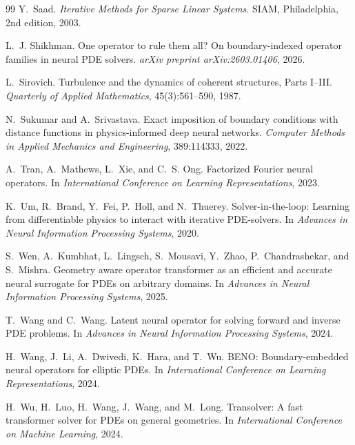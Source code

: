 \begin{thebibliography}{99}
Y.~Saad.
\newblock \emph{Iterative Methods for Sparse Linear Systems}.
\newblock SIAM, Philadelphia, 2nd edition, 2003.

L.~J. Shikhman.
\newblock One operator to rule them all? On boundary-indexed operator
families in neural PDE solvers.
\newblock \emph{arXiv preprint arXiv:2603.01406}, 2026.

L.~Sirovich.
\newblock Turbulence and the dynamics of coherent structures, Parts
I--III.
\newblock \emph{Quarterly of Applied Mathematics}, 45(3):561--590, 1987.

N.~Sukumar and A.~Srivastava.
\newblock Exact imposition of boundary conditions with distance
functions in physics-informed deep neural networks.
\newblock \emph{Computer Methods in Applied Mechanics and Engineering},
389:114333, 2022.

A.~Tran, A.~Mathews, L.~Xie, and C.~S. Ong.
\newblock Factorized Fourier neural operators.
\newblock In \emph{International Conference on Learning Representations},
2023.

K.~Um, R.~Brand, Y.~Fei, P.~Holl, and N.~Thuerey.
\newblock Solver-in-the-loop: Learning from differentiable physics to
interact with iterative PDE-solvers.
\newblock In \emph{Advances in Neural Information Processing Systems},
2020.

S.~Wen, A.~Kumbhat, L.~Lingsch, S.~Mousavi, Y.~Zhao, P.~Chandrashekar,
and S.~Mishra.
\newblock Geometry aware operator transformer as an efficient and
accurate neural surrogate for PDEs on arbitrary domains.
\newblock In \emph{Advances in Neural Information Processing Systems},
2025.

T.~Wang and C.~Wang.
\newblock Latent neural operator for solving forward and inverse PDE
problems.
\newblock In \emph{Advances in Neural Information Processing Systems},
2024.

H.~Wang, J.~Li, A.~Dwivedi, K.~Hara, and T.~Wu.
\newblock BENO: Boundary-embedded neural operators for elliptic PDEs.
\newblock In \emph{International Conference on Learning Representations},
2024.

H.~Wu, H.~Luo, H.~Wang, J.~Wang, and M.~Long.
\newblock Transolver: A fast transformer solver for PDEs on general
geometries.
\newblock In \emph{International Conference on Machine Learning}, 2024.


\end{thebibliography}
